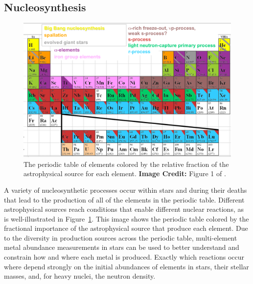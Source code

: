 \subsection{Nucleosynthesis} \label{intro:sec:nucleosynthesis}

\begin{figure}
  \centering
  \includegraphics[width=0.75\linewidth]{./figures/intro/periodic_table}
  \caption{The periodic table of elements colored by the relative fraction of the astrophysical source for each element. \textbf{Image Credit:} Figure 1 of \cite{Johnson2019}.}
  \label{intro:fig:periodic table}
\end{figure}

A variety of nucleosynthetic processes occur within stars and during their deaths that lead to the production of all of the elements in the periodic table. Different astrophysical sources reach conditions that enable different nuclear reactions, as is well-illustrated in Figure~\ref{intro:fig:periodic table}. This image shows the periodic table colored by the fractional importance of the astrophysical source that produce each element. Due to the diversity in production sources across the periodic table, multi-element metal abundance measurements in stars can be used to better understand and constrain how and where each metal is produced. Exactly which reactions occur where depend strongly on the initial abundances of elements in stars, their stellar masses, and, for heavy nuclei, the neutron density.

